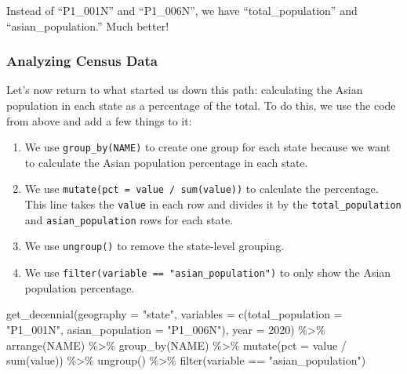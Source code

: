 \documentclass[
]{book}
\newenvironment{Shaded}{\begin{snugshade}}{\end{snugshade}}
\newcommand{\AttributeTok}[1]{\textcolor[rgb]{0.77,0.63,0.00}{#1}}
\newcommand{\DecValTok}[1]{\textcolor[rgb]{0.00,0.00,0.81}{#1}}
\newcommand{\FunctionTok}[1]{\textcolor[rgb]{0.00,0.00,0.00}{#1}}
\newcommand{\NormalTok}[1]{#1}
\newcommand{\SpecialCharTok}[1]{\textcolor[rgb]{0.00,0.00,0.00}{#1}}
\newcommand{\StringTok}[1]{\textcolor[rgb]{0.31,0.60,0.02}{#1}}
\providecommand{\tightlist}{%
  \setlength{\itemsep}{0pt}\setlength{\parskip}{0pt}}
\begin{document}
Instead of ``P1\_001N'' and ``P1\_006N'', we have ``total\_population'' and ``asian\_population.'' Much better!

\hypertarget{analyzing-census-data}{%
\subsubsection*{Analyzing Census Data}\label{analyzing-census-data}}

Let's now return to what started us down this path: calculating the Asian population in each state as a percentage of the total. To do this, we use the code from above and add a few things to it:

\begin{enumerate}
\def\labelenumi{\arabic{enumi}.}
\tightlist
\item
  We use \texttt{group\_by(NAME)} to create one group for each state because we want to calculate the Asian population percentage in each state.
\item
  We use \texttt{mutate(pct\ =\ value\ /\ sum(value))} to calculate the percentage. This line takes the \texttt{value} in each row and divides it by the \texttt{total\_population} and \texttt{asian\_population} rows for each state.
\item
  We use \texttt{ungroup()} to remove the state-level grouping.
\item
  We use \texttt{filter(variable\ ==\ "asian\_population")} to only show the Asian population percentage.
\end{enumerate}

\begin{Shaded}
\begin{Highlighting}[]
\FunctionTok{get\_decennial}\NormalTok{(}\AttributeTok{geography =} \StringTok{"state"}\NormalTok{, }
              \AttributeTok{variables =} \FunctionTok{c}\NormalTok{(}\AttributeTok{total\_population =} \StringTok{"P1\_001N"}\NormalTok{, }
                            \AttributeTok{asian\_population =} \StringTok{"P1\_006N"}\NormalTok{),}
              \AttributeTok{year =} \DecValTok{2020}\NormalTok{) }\SpecialCharTok{\%\textgreater{}\%} 
  \FunctionTok{arrange}\NormalTok{(NAME) }\SpecialCharTok{\%\textgreater{}\%} 
  \FunctionTok{group\_by}\NormalTok{(NAME) }\SpecialCharTok{\%\textgreater{}\%} 
  \FunctionTok{mutate}\NormalTok{(}\AttributeTok{pct =}\NormalTok{ value }\SpecialCharTok{/} \FunctionTok{sum}\NormalTok{(value)) }\SpecialCharTok{\%\textgreater{}\%} 
  \FunctionTok{ungroup}\NormalTok{() }\SpecialCharTok{\%\textgreater{}\%} 
  \FunctionTok{filter}\NormalTok{(variable }\SpecialCharTok{==} \StringTok{"asian\_population"}\NormalTok{)}
\end{Highlighting}
\end{Shaded}
\end{document}
